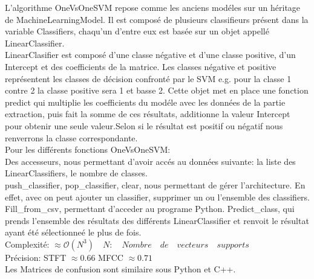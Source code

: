 \documentclass[10pt]{article}
\begin{document}
\begin{minipage}[t]{0.6\linewidth}


L'algorithme OneVsOneSVM repose comme les anciens modéles sur un héritage de MachineLearningModel. Il est composé de plusieurs classifieurs présent dans la variable Classifiers, chaqu'un d'entre eux est basée sur un objet appellé LinearClassifier. \\
 
LinearClasifier est composé d'une classe négative et d'une classe positive, d'un Intercept et des coefficients de la matrice. Les classes négative et positive représentent les classes de décision confronté par le SVM e.g. pour la classe 1 contre 2 la classe positive sera 1 et basse 2. Cette objet met en place une fonction predict qui multiplie les coefficients du modéle avec les données de la partie extraction, puis fait la somme de ces résultats, additionne la valeur Intercept pour obtenir une seule valeur.Selon si le résultat est positif ou négatif nous renverrons la classe correspondante. \\


Pour les différents fonctions OneVsOneSVM:\\
Des accesseurs, nous permettant d'avoir accés au données suivante: la liste des LinearClassifiers, le nombre de classes.\\
push\_classifier, pop\_classifier, clear, nous permettant de gérer l'architecture. En effet, avec on peut ajouter un classifier, supprimer un ou l'ensemble des classifiers.\\
Fill\_from\_csv, permettant d'acceder au programe Python. Predict\_class, qui prends l'ensemble des résultats des différents LinearClassifier et renvoit le résultat ayant été sélectionneé le plus de fois. \\

Complexité: $\approx \mathcal{O}(N^{3}) \quad N:\quad Nombre \quad de \quad vecteurs \quad supports $ \\ 
Précision: STFT $\approx 0.66$ MFCC $\approx 0.71$\\
Les Matrices de confusion sont similaire sous Python et C++.
\end{minipage}
 
\end{document}
